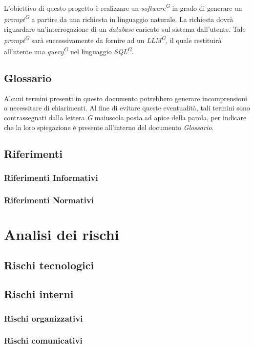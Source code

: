 \documentclass[5pt]{article}
\begin{document}
L'obiettivo di questo progetto è realizzare un \textit{software\textsuperscript{G}} in grado di generare 
un \textit{prompt\textsuperscript{G}} a partire da una richiesta in linguaggio naturale. La richiesta dovrà riguardare un'interrogazione 
di un \textit{database} caricato sul sistema dall'utente. Tale \textit{prompt\textsuperscript{G}} sarà successivamente da fornire 
ad un \textit{LLM\textsuperscript{G}}, il quale restituirà all'utente una \textit{query\textsuperscript{G}} nel linguaggio 
\textit{SQL\textsuperscript{G}}.

\subsection{Glossario}
Alcuni termini presenti in questo documento potrebbero generare incomprensioni o necessitare di chiarimenti. 
Al fine di evitare queste eventualità, tali termini sono contrassegnati dalla lettera \textit{G} maiuscola posta ad apice della parola, 
per indicare che la loro spiegazione è presente all'interno del documento \textit{Glossario}.

\subsection{Riferimenti}
\subsubsection{Riferimenti Informativi}
\subsubsection{Riferimenti Normativi}

\section{Analisi dei rischi}
\subsection{Rischi tecnologici}
\subsection{Rischi interni}
\subsubsection{Rischi organizzativi}
\subsubsection{Rischi comunicativi}
\end{document}
